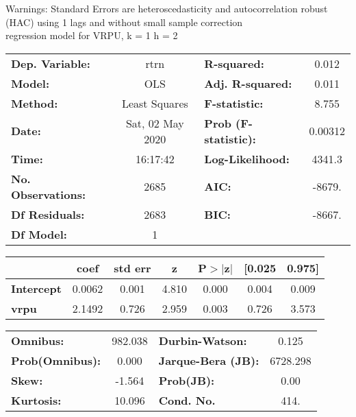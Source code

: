 Warnings: \newline
 [1] Standard Errors are heteroscedasticity and autocorrelation robust (HAC) using 1 lags and without small sample correction\\ 

regression model for VRPU, k = 1 h = 2\begin{center}
\begin{tabular}{lclc}
\toprule
\textbf{Dep. Variable:}    &       rtrn       & \textbf{  R-squared:         } &     0.012   \\
\textbf{Model:}            &       OLS        & \textbf{  Adj. R-squared:    } &     0.011   \\
\textbf{Method:}           &  Least Squares   & \textbf{  F-statistic:       } &     8.755   \\
\textbf{Date:}             & Sat, 02 May 2020 & \textbf{  Prob (F-statistic):} &  0.00312    \\
\textbf{Time:}             &     16:17:42     & \textbf{  Log-Likelihood:    } &    4341.3   \\
\textbf{No. Observations:} &        2685      & \textbf{  AIC:               } &    -8679.   \\
\textbf{Df Residuals:}     &        2683      & \textbf{  BIC:               } &    -8667.   \\
\textbf{Df Model:}         &           1      & \textbf{                     } &             \\
\bottomrule
\end{tabular}
\begin{tabular}{lcccccc}
                   & \textbf{coef} & \textbf{std err} & \textbf{z} & \textbf{P$> |$z$|$} & \textbf{[0.025} & \textbf{0.975]}  \\
\midrule
\textbf{Intercept} &       0.0062  &        0.001     &     4.810  &         0.000        &        0.004    &        0.009     \\
\textbf{vrpu}      &       2.1492  &        0.726     &     2.959  &         0.003        &        0.726    &        3.573     \\
\bottomrule
\end{tabular}
\begin{tabular}{lclc}
\textbf{Omnibus:}       & 982.038 & \textbf{  Durbin-Watson:     } &    0.125  \\
\textbf{Prob(Omnibus):} &   0.000 & \textbf{  Jarque-Bera (JB):  } & 6728.298  \\
\textbf{Skew:}          &  -1.564 & \textbf{  Prob(JB):          } &     0.00  \\
\textbf{Kurtosis:}      &  10.096 & \textbf{  Cond. No.          } &     414.  \\
\bottomrule
\end{tabular}
\end{center}

